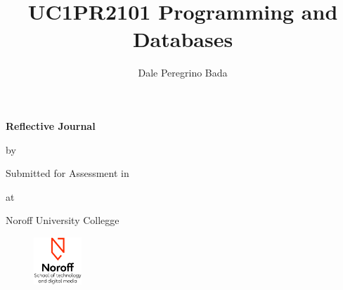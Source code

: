 \begin{titlepage}
  \begin{center}


      {\bfseries{\Huge{Reflective Journal}}}


      {\Large{by}}

    \begin{author}
      \author{\Large{Dale Peregrino Bada}}
    \end{author}


    \vspace*{2.5cm}
    Submitted for Assessment in


    \begin{title}
        \title{\bfseries{\huge{UC1PR2101 Programming and Databases}}}
    \end{title}

    \vspace*{2.5cm}
    at


    \Large{Noroff University Collegge}

    \vfill


    \begin{figure}[h!]
      \centering
      \includegraphics[height=50pt]{Noroff-Logo.png}
    \end{figure}


  \end{center}
\end{titlepage}
